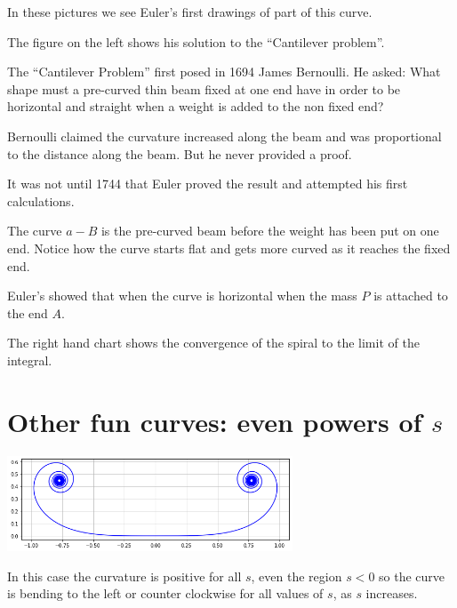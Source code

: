 \documentclass[12pt]{article} %
\theoremstyle{definition}
\theoremstyle{theorem}
\begin{document}
In these pictures we see Euler's first drawings of part of this curve. 

The figure on the left shows his solution to the ``Cantilever problem''.

The ``Cantilever Problem'' first posed in 1694 James Bernoulli. He asked: What shape must a pre-curved thin beam fixed at one end have in order to be horizontal and straight when a weight is added to the non fixed end? 

Bernoulli claimed the curvature increased along the beam and was proportional to the distance along the beam. But he never provided a proof.

It was not until 1744 that Euler proved the result and attempted his first calculations.

The curve $a-B$ is the pre-curved beam before the weight has been put on one end. Notice how the curve starts flat and gets more curved as it reaches the fixed end.

Euler's showed that when the curve is horizontal when the mass $P$ is attached to the end $A$.

The right hand chart shows the convergence of the spiral to the limit of the integral.

\section{Other fun curves: even powers of $s$}
\begin{tcolorbox}
	\begin{minipage}{\linewidth}
	\centering
	\includegraphics[width=85mm, scale=0.5]{chaise_longue.png}
\end{minipage}
\end{tcolorbox}

In this case the curvature is positive for all $s$, even the region $s<0$ so the curve is bending to the left or counter clockwise for all values of $s$, as $s$ increases.
\end{document}
